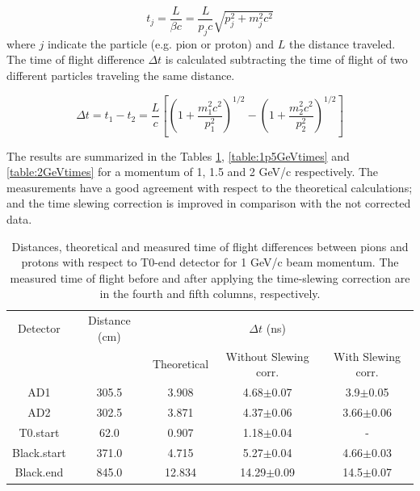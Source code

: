 	\begin{equation}
	t_j=\frac{L}{\beta c}=\frac{L}{p_j c}\sqrt{p_j^2+m_j^2c^2}
	\end{equation}
	where $j$ indicate the particle (e.g. pion or proton) and $L$ the distance traveled. The time of 
	flight difference $\Delta t$ is calculated subtracting the time of flight of two different particles
	traveling the same distance.
	
	\begin{equation}\label{eq:tof}
	\Delta t= t_1-t_2= \frac{L}{c}\left[\left(1+\frac{m_1^2c^2}{p^2_1}\right)^{1/2}- \left({1+\frac{m_2^2c^2}{p^2_2}}\right)^{1/2} \right]
	\end{equation}
	
	The results are summarized in the Tables \ref{table:1GeVtimes}, \ref{table:1p5GeVtimes}
	and \ref{table:2GeVtimes} for a momentum of 1, 1.5 and 2 GeV/c respectively. The measurements have a good
	agreement with respect to the theoretical calculations; and the time slewing correction is improved in
	comparison with the not corrected data.
	
	\begin{table}[h!]
		\centering
		\caption{Distances, theoretical and measured time of flight differences between pions and protons with respect
			to T0-end detector for 1 GeV/c beam momentum. The measured time of flight before and
			after applying the time-slewing correction are in the fourth and fifth columns, respectively.
			}
		\begin{tabular}{ | c|| c || c c c| } \hline
			Detector & Distance (cm)  &  &  $\Delta t$ (ns) &\\ 
					&	&Theoretical  &Without Slewing corr.&With Slewing corr. \\\hline
			
			AD1	    	&305.5	&3.908	&4.68$\pm$0.07	&3.9$\pm$0.05	\\
			AD2	    	&302.5	&3.871	&4.37$\pm$0.06	&3.66$\pm$0.06	\\
			T0.start 	&62.0	&0.907	&1.18$\pm$0.04	&-		\\
			Black.start	&371.0	&4.715	&5.27$\pm$0.04	&4.66$\pm$0.03	\\
			Black.end	&845.0	&12.834	&14.29$\pm$0.09	&14.5$\pm$0.07\\ \hline
			
		\end{tabular}
		\label{table:1GeVtimes}
	\end{table}

